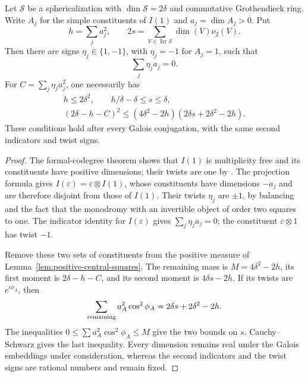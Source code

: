 \begin{proposition}
\label{prop:signed-translate-moment}
Let $\mathcal S$ be a sphericalization with
$\dim\mathcal S=2\delta$ and commutative Grothendieck ring. Write
$A_j$ for the simple constituents of $I(1)$ and $a_j=\dim A_j>0$.
Put
\[
 h=\sum_j a_j^2,\qquad
 2s=\sum_{V\in\operatorname{Irr}\mathcal S}\dim(V)\nu_2(V).
\]
Then there are signs $\eta_j\in\{1,-1\}$, with $\eta_j=-1$ for
$A_j=1$, such that
\[
 \sum_j\eta_ja_j=0.
\]
For $C=\sum_j\eta_ja_j^2$, one necessarily has
\begin{gather*}
 h\leq2\delta^2,\qquad h/\delta-\delta\leq s\leq\delta,\\
 (2\delta-h-C)^2
 \leq(4\delta^2-2h)(2\delta s+2\delta^2-2h).
\end{gather*}
These conditions hold after every Galois conjugation, with the same
second indicators and twist signs.
\end{proposition}
\begin{proof}
The formal-codegree theorem \cite[Theorem~2.13]{OstrikRank3} shows that
$I(1)$ is multiplicity free and its constituents have positive dimensions;
their twists are one by \cite[Theorem~2.5]{OstrikRank3}. The projection formula gives
$I(\varepsilon)=\varepsilon\otimes I(1)$, whose constituents have
dimensions $-a_j$ and are therefore disjoint from those of $I(1)$.
Their twists $\eta_j$ are $\pm1$, by balancing and the fact that the
monodromy with an invertible object of order two squares to one.
The indicator identity for $I(\varepsilon)$ gives
$\sum_j\eta_ja_j=0$; the constituent $\varepsilon\otimes1$ has twist
$-1$.

Remove these two sets of constituents from the positive measure of
Lemma~\ref{lem:positive-central-squares}. The remaining mass is
$M=4\delta^2-2h$, its first moment is $2\delta-h-C$, and its second
moment is $4\delta s-2h$. If its twists are $e^{i\phi_A}$, then
\[
 \sum_{\rm remaining}a_A^2\cos^2\phi_A
 =2\delta s+2\delta^2-2h.
\]
The inequalities $0\leq\sum a_A^2\cos^2\phi_A\leq M$ give the
two bounds on $s$. Cauchy--Schwarz gives the last inequality. Every
dimension remains real under the Galois embeddings under consideration,
whereas the second indicators and the twist signs are rational numbers
and remain fixed.
\end{proof}


